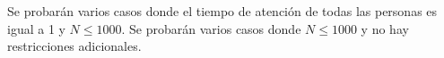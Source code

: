 \documentclass{oci}
\begin{document}

\begin{scoreDescription}
   Se probarán varios casos donde el tiempo de atención de todas las personas es igual a 1 y $N\leq 1000$.
   Se probarán varios casos donde $N\leq 1000$ y no hay restricciones adicionales.
\end{scoreDescription}

\begin{sampleDescription}
\end{sampleDescription}
\end{document}
